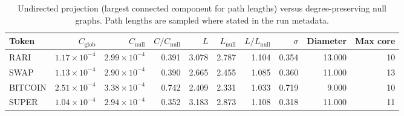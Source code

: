 \begin{table}[t]
\centering
\small
\caption{Undirected projection (largest connected component for path lengths) versus degree-preserving null graphs. Path lengths are sampled where stated in the run metadata.}
\label{tab:smallworld}
\begin{tabular}{lrrrrrrrrr}
\toprule
Token & $C_{\mathrm{glob}}$ & $C_{\mathrm{null}}$ & $C/C_{\mathrm{null}}$ & $L$ & $L_{\mathrm{null}}$ & $L/L_{\mathrm{null}}$ & $\sigma$ & Diameter & Max core \\
\midrule
RARI & $1.17\times10^{-4}$ & $2.99\times10^{-4}$ & 0.391 & 3.078 & 2.787 & 1.104 & 0.354 & 13.000 & 10 \\
SWAP & $1.13\times10^{-4}$ & $2.90\times10^{-4}$ & 0.390 & 2.665 & 2.455 & 1.085 & 0.360 & 11.000 & 13 \\
BITCOIN & $2.51\times10^{-4}$ & $3.38\times10^{-4}$ & 0.742 & 2.409 & 2.331 & 1.033 & 0.719 & 9.000 & 10 \\
SUPER & $1.04\times10^{-4}$ & $2.94\times10^{-4}$ & 0.352 & 3.183 & 2.873 & 1.108 & 0.318 & 11.000 & 11 \\
\bottomrule
\end{tabular}
\end{table}
